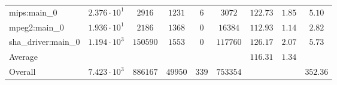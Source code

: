 \begin{tabular}{|l|c|c|c|c|c|c|c|c|}
mips:main\_0            & $ 2.376 \cdot 10^{1} $ & $ 2916   $ & $ 1231  $ & $ 6   $ & $ 3072   $ & $ 122.73      $ & $ 1.85    $ & $ 5.10    $ \\
mpeg2:main\_0           & $ 1.936 \cdot 10^{1} $ & $ 2186   $ & $ 1368  $ & $ 0   $ & $ 16384  $ & $ 112.93      $ & $ 1.14    $ & $ 2.82    $ \\
sha\_driver:main\_0     & $ 1.194 \cdot 10^{3} $ & $ 150590 $ & $ 1553  $ & $ 0   $ & $ 117760 $ & $ 126.17      $ & $ 2.07    $ & $ 5.73    $ \\
\hline
Average                 & $                    $ & $        $ & $       $ & $     $ & $        $ & $ 116.31      $ & $ 1.34    $ & $         $ \\
\hline
Overall                 & $ 7.423 \cdot 10^{3} $ & $ 886167 $ & $ 49950 $ & $ 339 $ & $ 753354 $ & $             $ & $         $ & $ 352.36  $ \\
\hline
\end{tabular}
